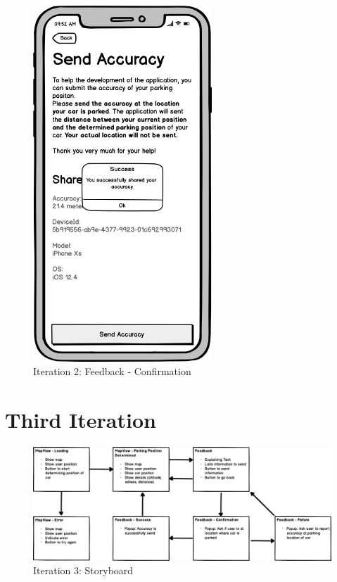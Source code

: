 \begin{figure}[H]
  \centering
  \begin{minipage}[b]{0.45\textwidth}
    \centering
    \includegraphics[width=0.6\textwidth]{images/UI/Iteration2-Feedback-Confirmation.png}
    \caption{Iteration 2: Feedback - Confirmation}
    \label{fig:i2-feedback-con}
  \end{minipage}
  \hfill
  \begin{minipage}[b]{0.45\textwidth}
    
  \end{minipage}
\end{figure}

\section{Third Iteration}

\begin{figure}[H]
    \centering
    \includegraphics[width=\textwidth]{images/UI/Iteration3-Overview.png}
    \caption{Iteration 3: Storyboard}
    \label{fig:i3story}
\end{figure}

